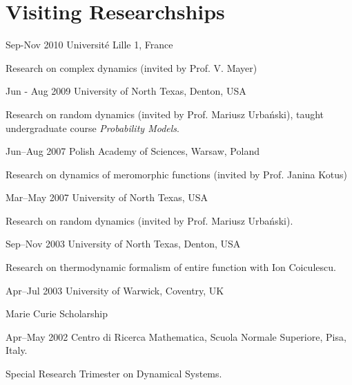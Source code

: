 \documentclass{article}
\begin{document}
\section{Visiting Researchships}
\begin{CV}
  \item[Sep-Nov 2010] Universit{\'e} Lille 1, France

    Research on complex dynamics (invited by Prof. V. Mayer)

    
  \item[Jun - Aug 2009] University of North Texas, Denton, USA
  
    Research on random dynamics (invited by Prof. Mariusz
    Urba{\'n}ski), taught undergraduate course \emph{Probability Models}.
  \item[Jun--Aug 2007] Polish Academy of Sciences, Warsaw, Poland

    Research on dynamics of meromorphic functions (invited by
    Prof. Janina Kotus)
  \item[Mar--May 2007] University of North Texas, USA
  
    Research on random dynamics (invited by Prof. Mariusz
    Urba{\'n}ski).

  \item[Sep--Nov 2003] University of North Texas, Denton, USA

    Research on thermodynamic formalism of entire function with Ion
    Coiculescu.
  \item[Apr--Jul 2003] University of Warwick, Coventry, UK
    
    Marie Curie Scholarship
  \item[Apr--May 2002] Centro di Ricerca Mathematica, Scuola Normale
    Superiore, Pisa, Italy.

    Special Research Trimester on Dynamical Systems.
\end{CV}
\end{document}
